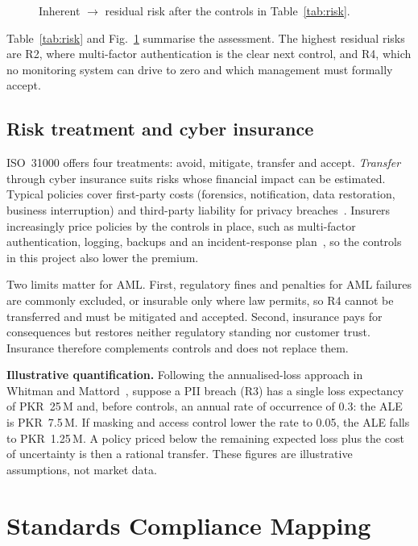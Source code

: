 \documentclass[conference,10pt]{IEEEtran}
\begin{document}
\begin{figure}[t]
  \centering
  \resizebox{0.95\columnwidth}{!}{}
  \caption{Inherent $\rightarrow$ residual risk after the controls in Table~\ref{tab:risk}.}
  \label{fig:heat}
\end{figure}

Table~\ref{tab:risk} and Fig.~\ref{fig:heat} summarise the assessment. The highest residual risks
are R2, where multi-factor authentication is the clear next control, and R4, which no monitoring
system can drive to zero and which management must formally accept.

\subsection{Risk treatment and cyber insurance}
ISO~31000 offers four treatments: avoid, mitigate, transfer and accept. \emph{Transfer} through
cyber insurance suits risks whose financial impact can be estimated. Typical policies cover
first-party costs (forensics, notification, data restoration, business interruption) and
third-party liability for privacy breaches~\cite{marotta2017insurance}. Insurers increasingly price
policies by the controls in place, such as multi-factor authentication, logging, backups and an
incident-response plan~\cite{romanosky2019insurance}, so the controls in this project also lower
the premium.

Two limits matter for AML. First, regulatory fines and penalties for AML failures are commonly
excluded, or insurable only where law permits, so R4 cannot be transferred and must be mitigated and
accepted. Second, insurance pays for consequences but restores neither regulatory standing nor
customer trust. Insurance therefore complements controls and does not replace them.

\textbf{Illustrative quantification.} Following the annualised-loss approach in
Whitman and Mattord~\cite{whitman2012principles}, suppose a PII breach (R3) has a single loss
expectancy of PKR~25\,M and, before controls, an annual rate of occurrence of 0.3: the ALE is
PKR~7.5\,M. If masking and access control lower the rate to 0.05, the ALE falls to PKR~1.25\,M.
A policy priced below the remaining expected loss plus the cost of uncertainty is then a rational
transfer. These figures are illustrative assumptions, not market data.

\section{Standards Compliance Mapping}
\end{document}

